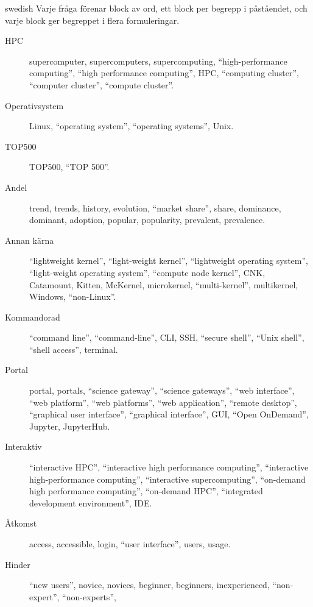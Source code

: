 \begin{onlyin}{swedish}
Varje fråga förenar block av ord, ett block per begrepp i påståendet, och
varje block ger begreppet i flera formuleringar.
\begingroup\raggedright
\begin{description}
  \item[HPC] supercomputer, supercomputers, supercomputing,
    \enquote{high-performance computing}, \enquote{high performance
    computing}, HPC, \enquote{computing cluster}, \enquote{computer
    cluster}, \enquote{compute cluster}.
  \item[Operativsystem] Linux, \enquote{operating system},
    \enquote{operating systems}, Unix.
  \item[TOP500] TOP500, \enquote{TOP 500}.
  \item[Andel] trend, trends, history, evolution, \enquote{market
    share}, share, dominance, dominant, adoption, popular, popularity,
    prevalent, prevalence.
  \item[Annan kärna] \enquote{lightweight kernel},
    \enquote{light-weight kernel}, \enquote{lightweight operating
    system}, \enquote{light-weight operating system}, \enquote{compute
    node kernel}, CNK, Catamount, Kitten, McKernel, microkernel,
    \enquote{multi-kernel}, multikernel, Windows, \enquote{non-Linux}.
  \item[Kommandorad] \enquote{command line}, \enquote{command-line},
    CLI, SSH, \enquote{secure shell}, \enquote{Unix shell},
    \enquote{shell access}, terminal.
  \item[Portal] portal, portals, \enquote{science gateway},
    \enquote{science gateways}, \enquote{web interface}, \enquote{web
    platform}, \enquote{web platforms}, \enquote{web application},
    \enquote{remote desktop}, \enquote{graphical user interface},
    \enquote{graphical interface}, GUI, \enquote{Open OnDemand},
    Jupyter, JupyterHub.
  \item[Interaktiv] \enquote{interactive HPC}, \enquote{interactive
    high performance computing}, \enquote{interactive high-performance
    computing}, \enquote{interactive supercomputing}, \enquote{on-demand
    high performance computing}, \enquote{on-demand HPC},
    \enquote{integrated development environment}, IDE.
  \item[Åtkomst] access, accessible, login, \enquote{user interface},
    users, usage.
  \item[Hinder] \enquote{new users}, novice, novices, beginner,
    beginners, inexperienced, \enquote{non-expert}, \enquote{non-experts},

\end{description}
\end{onlyin}
